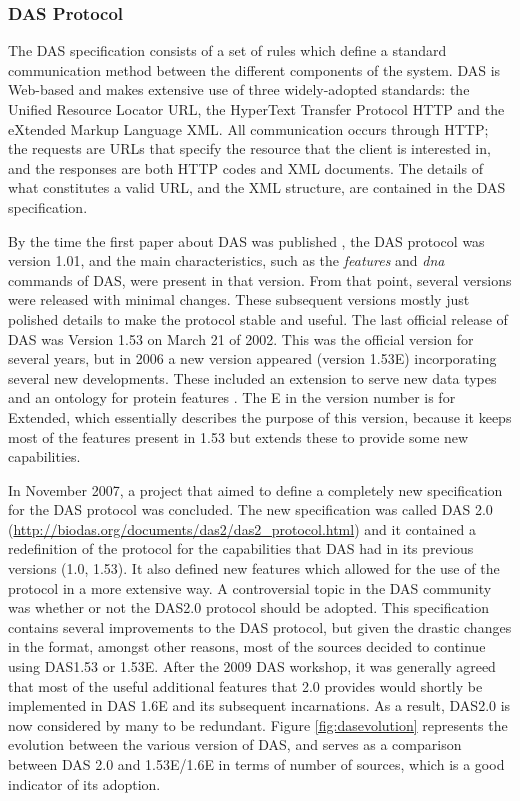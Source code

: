 \subsubsection{DAS Protocol}
\label{ssec:DASprotocol}
The DAS specification consists of a set of rules which define a standard communication method between the different components of the system. DAS is Web-based and makes extensive use of three widely-adopted standards: the Unified Resource Locator URL, the HyperText Transfer Protocol HTTP and the eXtended Markup Language XML. All communication occurs through HTTP; the requests are URLs that specify the resource that the client is interested in, and the responses are both HTTP codes and XML documents. The details of what constitutes a valid URL, and the XML structure, are contained in the DAS specification.

By the time the first paper about DAS was published \cite{DOW2001}, the DAS protocol was version 1.01, and the main characteristics, such as the \emph{features} and \emph{dna} commands of DAS, were present in that version. From that point, several versions were released with minimal changes. These subsequent versions mostly just polished details to make the protocol stable and useful. The last official release of DAS was Version 1.53 on March 21 of 2002. This was the official version for several years, but in 2006 a new version appeared (version 1.53E) incorporating several new developments. These included an extension to serve new data types and an ontology for protein features \cite{JEN2008}. The E in the version number is for Extended, which essentially describes the purpose of this version, because it keeps most of the features present in 1.53 but extends these to provide some new capabilities.

In November 2007, a project that aimed to define a completely new specification for the DAS protocol was concluded. The new specification was called DAS 2.0 (\url{http://biodas.org/documents/das2/das2\_protocol.html}) and it contained a redefinition of the protocol for the capabilities that DAS had in its previous versions (1.0, 1.53). It also defined new features which allowed for the use of the protocol in a more extensive way. A controversial topic in the DAS community was whether or not the DAS2.0 protocol should be adopted. This specification contains several improvements to the DAS protocol, but given the drastic changes in the format, amongst other reasons, most of the sources decided to continue using DAS1.53 or 1.53E. After the 2009 DAS workshop, it was generally agreed that most of the useful additional features that 2.0 provides would shortly be implemented in DAS 1.6E and its subsequent incarnations. As a result, DAS2.0 is now considered by many to be redundant. Figure \ref{fig:dasevolution} represents the evolution between the various version of DAS, and serves as a comparison between DAS 2.0 and 1.53E/1.6E in terms of number of sources, which is a good indicator of its adoption.

